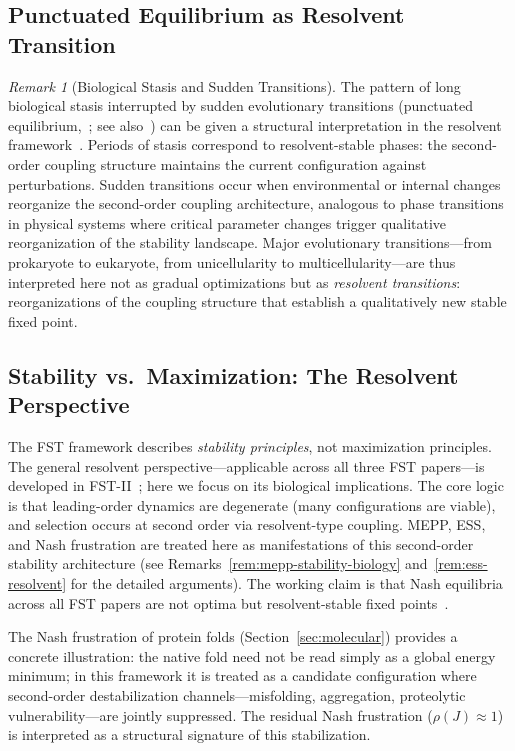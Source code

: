 \documentclass[12pt,a4paper]{article}
\theoremstyle{remark}
\newtheorem{remark}{Remark}
\begin{document}
\subsection{Punctuated Equilibrium as Resolvent Transition}

\begin{remark}[Biological Stasis and Sudden Transitions]
\label{rem:punctuated-equilibrium}
The pattern of long biological stasis interrupted by sudden evolutionary transitions (punctuated equilibrium,~\citealp{GouldEldredge1977}; see also~\citealp{KauffmanOrigins}) can be given a structural interpretation in the resolvent framework~\citep{GeigerRH2026b}. Periods of stasis correspond to resolvent-stable phases: the second-order coupling structure maintains the current configuration against perturbations. Sudden transitions occur when environmental or internal changes reorganize the second-order coupling architecture, analogous to phase transitions in physical systems where critical parameter changes trigger qualitative reorganization of the stability landscape. Major evolutionary transitions---from prokaryote to eukaryote, from unicellularity to multicellularity---are thus interpreted here not as gradual optimizations but as \emph{resolvent transitions}: reorganizations of the coupling structure that establish a qualitatively new stable fixed point.
\end{remark}

\subsection{Stability vs.\ Maximization: The Resolvent Perspective}

The FST framework describes \emph{stability principles}, not maximization principles. The general resolvent perspective---applicable across all three FST papers---is developed in FST-II~\citep{FSTII}; here we focus on its biological implications. The core logic is that leading-order dynamics are degenerate (many configurations are viable), and selection occurs at second order via resolvent-type coupling. MEPP, ESS, and Nash frustration are treated here as manifestations of this second-order stability architecture (see Remarks~\ref{rem:mepp-stability-biology} and~\ref{rem:ess-resolvent} for the detailed arguments). The working claim is that Nash equilibria across all FST papers are not optima but resolvent-stable fixed points~\citep{GeigerRH2026b}.

The Nash frustration of protein folds (Section~\ref{sec:molecular}) provides a concrete illustration: the native fold need not be read simply as a global energy minimum; in this framework it is treated as a candidate configuration where second-order destabilization channels---misfolding, aggregation, proteolytic vulnerability---are jointly suppressed. The residual Nash frustration ($\rho(J) \approx 1$) is interpreted as a structural signature of this stabilization.
\end{document}
